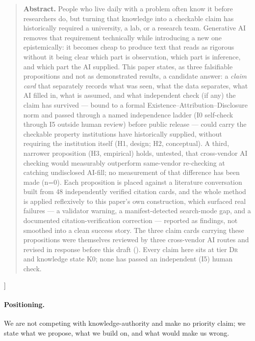 \documentclass[10pt,twocolumn]{article}
\newcommand{\DrTier}{\textsc{Dr}}
\begin{document}
\vspace{0.7em}
\begin{quote}
\small\noindent\textbf{Abstract.} People who live daily with a problem often know it before
researchers do, but turning that knowledge into a checkable claim has historically required a
university, a lab, or a research team. Generative AI removes that requirement technically while
introducing a new one epistemically: it becomes cheap to produce text that reads as rigorous
without it being clear which part is observation, which part is inference, and which part the AI
supplied. This paper states, as three falsifiable propositions and not as demonstrated results, a
candidate answer: a \emph{claim card} that separately records what was seen, what the data
separates, what AI filled in, what is assumed, and what independent check (if any) the claim has
survived --- bound to a formal Existence--Attribution--Disclosure norm and passed through a named
independence ladder (I0 self-check through I5 outside human review) before public release ---
could carry the checkable property institutions have historically supplied, without requiring the
institution itself (H1, design; H2, conceptual). A third, narrower proposition (H3, empirical)
holds, untested, that cross-vendor AI checking would measurably outperform same-vendor re-checking
at catching undisclosed AI-fill; no measurement of that difference has been made (n=0). Each
proposition is placed against a literature conversation built from 48 independently verified
citation cards, and the whole method is applied reflexively to this paper's own construction, which
surfaced real failures --- a validator warning, a manifest-detected search-mode gap, and a
documented citation-verification correction --- reported as findings, not smoothed into a clean
success story. The three claim cards carrying these propositions were themselves reviewed by three
cross-vendor AI routes and revised in response before this draft (). Every
claim here sits at tier \DrTier{} and knowledge state K0; none has passed an independent (I5) human
check.
\end{quote}
\vspace{0.7em}
]

\paragraph{Positioning.} We are not competing with knowledge-authority and make no priority claim;
we state what we propose, what we build on, and what would make us wrong.
\end{document}
